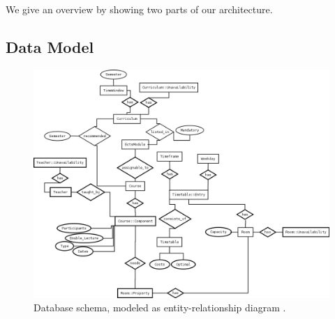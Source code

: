 \documentclass[12pt]{article} %
\begin{document}
We give an overview by showing two parts of our architecture.

\subsection{Data Model} 

\begin{figure}[h]
    \includegraphics[width=\textwidth]{TimetablingER_Dia.png}
    \caption{Database schema, modeled as entity-relationship diagram \cite{Chen76}.}
    \label{fig:schema}    
\end{figure}
\end{document}
